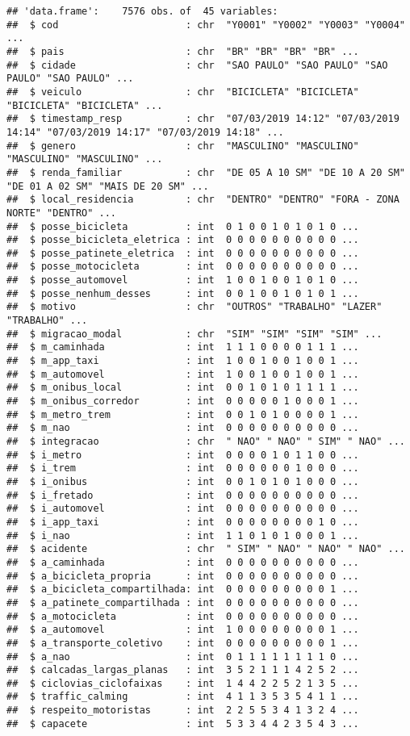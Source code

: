 \documentclass[]{article}
\begin{document}
\begin{verbatim}
## 'data.frame':    7576 obs. of  45 variables:
##  $ cod                      : chr  "Y0001" "Y0002" "Y0003" "Y0004" ...
##  $ pais                     : chr  "BR" "BR" "BR" "BR" ...
##  $ cidade                   : chr  "SAO PAULO" "SAO PAULO" "SAO PAULO" "SAO PAULO" ...
##  $ veiculo                  : chr  "BICICLETA" "BICICLETA" "BICICLETA" "BICICLETA" ...
##  $ timestamp_resp           : chr  "07/03/2019 14:12" "07/03/2019 14:14" "07/03/2019 14:17" "07/03/2019 14:18" ...
##  $ genero                   : chr  "MASCULINO" "MASCULINO" "MASCULINO" "MASCULINO" ...
##  $ renda_familiar           : chr  "DE 05 A 10 SM" "DE 10 A 20 SM" "DE 01 A 02 SM" "MAIS DE 20 SM" ...
##  $ local_residencia         : chr  "DENTRO" "DENTRO" "FORA - ZONA NORTE" "DENTRO" ...
##  $ posse_bicicleta          : int  0 1 0 0 1 0 1 0 1 0 ...
##  $ posse_bicicleta_eletrica : int  0 0 0 0 0 0 0 0 0 0 ...
##  $ posse_patinete_eletrica  : int  0 0 0 0 0 0 0 0 0 0 ...
##  $ posse_motocicleta        : int  0 0 0 0 0 0 0 0 0 0 ...
##  $ posse_automovel          : int  1 0 0 1 0 0 1 0 1 0 ...
##  $ posse_nenhum_desses      : int  0 0 1 0 0 1 0 1 0 1 ...
##  $ motivo                   : chr  "OUTROS" "TRABALHO" "LAZER" "TRABALHO" ...
##  $ migracao_modal           : chr  "SIM" "SIM" "SIM" "SIM" ...
##  $ m_caminhada              : int  1 1 1 0 0 0 0 1 1 1 ...
##  $ m_app_taxi               : int  1 0 0 1 0 0 1 0 0 1 ...
##  $ m_automovel              : int  1 0 0 1 0 0 1 0 0 1 ...
##  $ m_onibus_local           : int  0 0 1 0 1 0 1 1 1 1 ...
##  $ m_onibus_corredor        : int  0 0 0 0 0 1 0 0 0 1 ...
##  $ m_metro_trem             : int  0 0 1 0 1 0 0 0 0 1 ...
##  $ m_nao                    : int  0 0 0 0 0 0 0 0 0 0 ...
##  $ integracao               : chr  " NAO" " NAO" " SIM" " NAO" ...
##  $ i_metro                  : int  0 0 0 0 1 0 1 1 0 0 ...
##  $ i_trem                   : int  0 0 0 0 0 0 1 0 0 0 ...
##  $ i_onibus                 : int  0 0 1 0 1 0 1 0 0 0 ...
##  $ i_fretado                : int  0 0 0 0 0 0 0 0 0 0 ...
##  $ i_automovel              : int  0 0 0 0 0 0 0 0 0 0 ...
##  $ i_app_taxi               : int  0 0 0 0 0 0 0 0 1 0 ...
##  $ i_nao                    : int  1 1 0 1 0 1 0 0 0 1 ...
##  $ acidente                 : chr  " SIM" " NAO" " NAO" " NAO" ...
##  $ a_caminhada              : int  0 0 0 0 0 0 0 0 0 0 ...
##  $ a_bicicleta_propria      : int  0 0 0 0 0 0 0 0 0 0 ...
##  $ a_bicicleta_compartilhada: int  0 0 0 0 0 0 0 0 0 1 ...
##  $ a_patinete_compartilhada : int  0 0 0 0 0 0 0 0 0 0 ...
##  $ a_motocicleta            : int  0 0 0 0 0 0 0 0 0 0 ...
##  $ a_automovel              : int  1 0 0 0 0 0 0 0 0 1 ...
##  $ a_transporte_coletivo    : int  0 0 0 0 0 0 0 0 0 1 ...
##  $ a_nao                    : int  0 1 1 1 1 1 1 1 1 0 ...
##  $ calcadas_largas_planas   : int  3 5 2 1 1 1 4 2 5 2 ...
##  $ ciclovias_ciclofaixas    : int  1 4 4 2 2 5 2 1 3 5 ...
##  $ traffic_calming          : int  4 1 1 3 5 3 5 4 1 1 ...
##  $ respeito_motoristas      : int  2 2 5 5 3 4 1 3 2 4 ...
##  $ capacete                 : int  5 3 3 4 4 2 3 5 4 3 ...
\end{verbatim}
\end{document}
